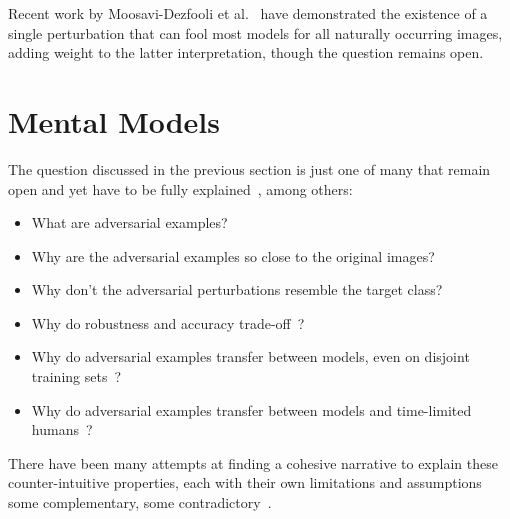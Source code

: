 \documentclass[a4paper, oneside]{discothesis}
\begin{document}
Recent work by Moosavi-Dezfooli et al.\ \cite{moosavi2017universal} have demonstrated the existence of a single perturbation that can fool most models for all naturally occurring images, adding weight to the latter interpretation, though the question remains open.

\section{Mental Models}

The question discussed in the previous section is just one of many that remain open and yet have to be fully explained~\cite{shamir2021dimpled}, among others:

\begin{itemize}
	\setlength\itemsep{0em}
	\item What are adversarial examples?
	\item Why are the adversarial examples so close to the original images?
	\item Why don't the adversarial perturbations resemble the target class?
	\item Why do robustness and accuracy trade-off~\cite{zhang2019theoretically}?
	\item Why do adversarial examples transfer between models, even on disjoint training sets~\cite{szegedy2013intriguing}?
	\item Why do adversarial examples transfer between models and time-limited humans~\cite{elsayed2018adversarial}?
\end{itemize}

There have been many attempts at finding a cohesive narrative to explain these counter-intuitive properties, each with their own limitations and assumptions \textendash{} some complementary, some contradictory~\cite{ilyas2019adversarial}.
\end{document}
